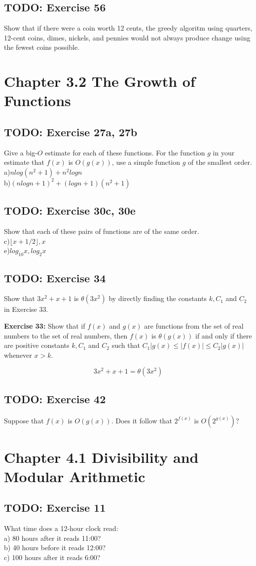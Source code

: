 \documentclass[12pt]{article}
\begin{document}
    \subsection{TODO: Exercise 56}
    Show that if there were a coin worth 12 cents, the greedy algoritm using quarters, 12-cent coins, dimes, nickels, and pennies would not always produce change using the fewest coins possible.

    \pagebreak
    \section{Chapter 3.2 The Growth of Functions}
    \subsection{TODO: Exercise 27a, 27b}
    Give a big-$O$ estimate for each of these functions. For the function $g$ in your estimate that $f(x)$ is $O(g(x))$, use a simple function $g$ of the smallest order.\\
    a)$n log(n^2+1)+n^2 log n$\\
    b)$(n log n + 1)^2+(log n+1)(n^2+1)$

    \subsection{TODO: Exercise 30c, 30e}
    Show that each of these pairs of functions are of the same order.\\
    c)$\lfloor x + 1/2 \rfloor,x$\\
    e)$log_{10}x,log_{2}x$

    \subsection{TODO: Exercise 34}
    Show that $3x^2+x+1$ is $\theta (3x^2)$ by directly finding the constants $k, C_1$ and $C_2$ in Exercise 33.

    \textbf{Exercise 33:}
    Show that if $f(x)$ and $g(x)$ are functions from the set of real numbers to the set of real numbers, then $f(x)$ is $\theta (g(x))$ if and only if there are positive constants $k, C_1$ and $C_2$ such that $C_1|g(x) \leq |f(x)| \leq C_2|g(x)|$ whenever $x > k$.

    \begin{equation}
        3x^2+x+1 = \theta (3x^2)
    \end{equation}

    \subsection{TODO: Exercise 42}
    Suppose that $f(x)$ is $O(g(x))$. Does it follow that $2^{f(x)}$ is $O(2^{g(x)})$?
    
    \pagebreak
    \section{Chapter 4.1 Divisibility and Modular Arithmetic}
    \subsection{TODO: Exercise 11}
    What time does a 12-hour clock read:\\
    a) 80 hours after it reads 11:00?\\
    b) 40 hours before it reads 12:00?\\
    c) 100 hours after it reads 6:00?
\end{document}
